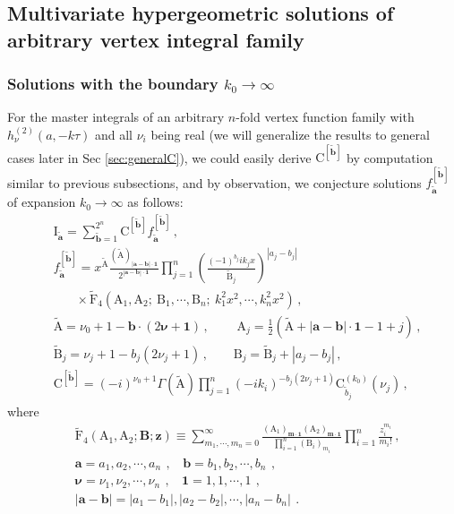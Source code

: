 \documentclass[a4paper,11pt]{article}
\newcommand{\nn}{\nonumber}
\begin{document}
\subsection{Multivariate hypergeometric solutions of arbitrary vertex integral family}   \label{sec:1-v_nf}
\subsubsection{Solutions with the boundary $k_0\to\infty$}


For the master integrals of an arbitrary $n$-fold vertex function family with  $h^{(2)}_\nu(a,-k\tau)$ and all  $\nu_i$ being real (we will generalize the results to general cases later in Sec \ref{sec:generalC}), we could easily derive $\text{C}^{[\tilde{\bm{b}}]}$ by computation similar to previous subsections, and by observation, we conjecture  solutions $f_{\tilde{\bm{a}}}^{[\tilde{\bm{b}}]}$  of expansion $k_0\to\infty$ as follows:
\begin{align}
&\text{I}_{\tilde{\bm{a}}}= \sum_{\tilde{\bm{b}}=1}^{2^n} \text{C}^{[\tilde{\bm{b}}]}f_{\tilde{\bm{a}}}^{[\tilde{\bm{b}}]}\, , \nn\\
&f_{\tilde{\bm{a}}}^{[\tilde{\bm{b}}]}=x^{\tilde{\text{A}}} 
\frac{(\tilde{\text{A}})_{|\bm{a}-\bm{b}|\cdot \bm{1}} }{2^{|\bm{a}-\bm{b}|\cdot \bm{1}}} 
\prod_{j=1}^n \left(\frac{(-1)^{b_j}  
 i k_j x }{\tilde{\text{B}}_j}\right)^{|a_j-b_j|} \nn\\
 &~~~~~~~~\times 
\tilde{\text{F}}_4\left(\text{A}_1,\text{A}_2;~\text{B}_1,\cdots,\text{B}_n;~k_1^2x^2,\cdots,k_n^2x^2\right) 
 \,  , \nn\\
 &\tilde{\text{A}}=\nu_0+1-\bm{b}\cdot (        2\bm{\nu}+\bm{1})\,,~~~~~~~~~~ \text{A}_j = \frac{1}{2}\left(\tilde{\text{A}}+|\bm{a}-\bm{b}|\cdot \bm{1}-1 + j\right)  \, ,\nn\\
 & \tilde{\text{B}}_j = \nu_j+1-b_j(2\nu_j+1) \, , ~~~~~~~~~\text{B}_j= \tilde{\text{B}}_j+|a_j-b_j|  \,, \\
 &\text{C}^{[\tilde{\bm{b}}]} = (-i)^{\nu_0+1} \Gamma(\tilde{\text{A}}) \prod_{j=1}^n (-ik_i)^{-b_j(2\nu_j+1)}\text{C}_{\tilde{b}_j}^{(k_0)}(\nu_j) \, ,
\end{align}
where
\begin{align}
&\tilde{\text{F}}_4\left(\text{A}_1,\text{A}_2;\textbf{B};\bm{z}\right)\equiv \sum_{m_1,\cdots,m_n=0}^\infty \frac{(\text{A}_1)_{\bm{m}\cdot \bm{1}}(\text{A}_2)_{\bm{m}\cdot \bm{1}}}{\prod_{i=1}^n(\text{B}_i)_{m_i}}  \prod_{i=1}^n \frac{z_i^{m_i}}{m_i!}  \, , \nn\\
&\bm{a}=a_1,a_2,\cdots,a_n \,~,~~~~\bm{b}=b_1,b_2,\cdots,b_n \, ~, \nn\\
&\bm{\nu}=\nu_1,\nu_2,\cdots,\nu_n  \,~,~~~~\bm{1}=1,1,\cdots,1 \, ~,\nn\\
&|\bm{a}-\bm{b}|=|a_1-b_1|,|a_2-b_2|,\cdots,|a_n-b_n| \,~.
\end{align}
\end{document}

